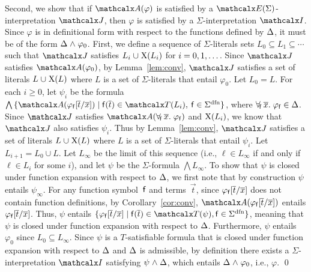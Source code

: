 \begin{rep}
\begin{proofsketch}
Second, we show that if $\conv( \varphi )$ is satisfied by a
$\extendsig{\Sigma}$-interpretation $\J$, then $\varphi$ is satisfied by a
$\Sigma$-interpretation $\I$. Since $\varphi$ is in definitional form with
respect to the functions defined by $\DDD$, it must be of the form
$\DDD \wedge \varphi_0$. 
First, we define a sequence of $\Sigma$-literals sets $L_0 \subseteq L_1 \subseteq \cdots$
such that $\J$ satisfies $L_i \cup \absconstraints( L_i )$ for $i = 0, 1, \ldots\vthinspace$.
Since $\J$ satisfies $\conv( \varphi_0 )$,
by Lemma~\ref{lem:conv}, 
$\J$ satisfies a set of literals $L \cup \absconstraints( L )$ where $L$ is a set of $\Sigma$-literals that entail $\varphi_0$.
Let $L_0 = L$.
For each $i \geq 0$,
let $\psi_i$ be the formula $\bigwedge\, \{ \conv( \varphi_{\con{f}}[ \vec t / \vec x ] ) \mid \con{f}( \vec t ) \in \terms( L_i ),\: \con{f} \in \sfundefs{\Sigma} \}$,
where $\forallf{\con{f}} \vec x.\; \varphi_{\con{f}} \in \DDD$.
Since $\J$ satisfies $\conv( \forallf{\con{f}} \vec x.\; \varphi_{\con{f}} )$ and $\mathrm{X}( L_i )$,
we know that $\J$ also satisfies $\psi_i$.
Thus by Lemma~\ref{lem:conv},
$\J$ satisfies a set of literals $L \cup \absconstraints( L )$ where $L$ is a set of $\Sigma$-literals that entail $\psi_i$.
Let $L_{i+1} = L_0 \cup L$.
Let $L_\infty$ be the limit of this sequence (i.e., $\ell \in L_\infty$ if and only if
$\ell \in L_i$ for some $i$),
and let $\psi$ be the $\Sigma$-formula $\bigwedge L_\infty$.
To show that $\psi$ is closed under function expansion with respect to $\DDD$,
we first note that by construction $\psi$ entails $\psi_\infty$.
For any function symbol~$\mathsf{f}$ and terms~$\vec t$, since $\varphi_{\mathsf{f}}[ \overline{t} / \overline{x} ]$ does not contain function definitions,
by Corollary~\ref{cor:conv},
$\conv( \varphi_{\con{f}}[ \vec t / \vec x ] )$ entails $\varphi_{\mathsf{f}}[ \overline{t} / \overline{x} ]$.
Thus, $\psi$ entails $\{ \varphi_{\con{f}}[ \vec t / \vec x ] \mid \con{f}( \vec t ) \in \terms( \psi ), \con{f} \in \sfundefs{\Sigma} \}$,
meaning that $\psi$ is closed under function expansion with respect to $\DDD$.
Furthermore, $\psi$ entails $\varphi_0$ since $L_0 \subseteq L_\infty$.
Since $\psi$ is a $T$-satisfiable formula that is closed under function expansion with respect to $\DDD$ and $\DDD$ is admissible, 
by definition there exists a $\Sigma$-interpretation $\I$ satisfying $\psi \wedge \DDD$, which entails $\DDD \wedge \varphi_0$,
i.e., $\varphi$.
\qed
\end{proofsketch}


\end{rep}
